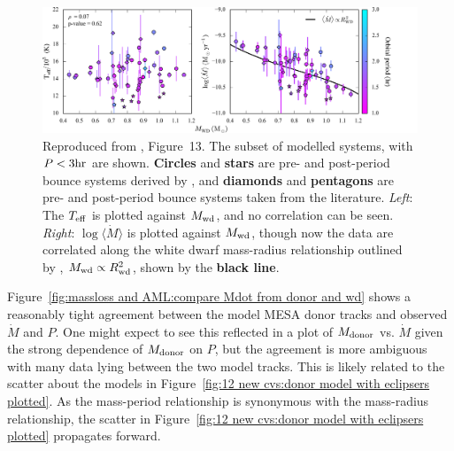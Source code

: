\begin{figure}
    \centering
    \includegraphics[width=\textwidth]{figures/modelling/pala_2022_fig13.png}
    \caption{Reproduced from \citet{Pala2021}, Figure~13. The subset of modelled systems, with $P < 3{\rm hr}$ are shown. {\bf Circles} and {\bf stars} are pre- and post-period bounce systems derived by \citet{Pala2021}, and {\bf diamonds} and {\bf pentagons} are pre- and post-period bounce systems taken from the literature. {\it Left}: The $T_{\rm eff}$ is plotted against $M_{\rm wd}$, and no correlation can be seen. {\it Right}: $\log \langle \dot M \rangle$ is plotted against $M_{\rm wd}$, though now the data are correlated along the white dwarf mass-radius relationship outlined by \citet{Pala2021}, $M_{\rm wd} \propto R_{\rm wd}^{2}$, shown by the {\bf black line}.}
    \label{fig:modelling:pala2022 fig13}
\end{figure}

Figure~\ref{fig:massloss and AML:compare Mdot from donor and wd} shows a reasonably tight agreement between the model MESA donor tracks and observed $\dot M$ and $P$.
One might expect to see this reflected in a plot of $M_{\rm donor}$ vs. $\dot M$ given the strong dependence of $M_{\rm donor}$ on $P$, but the agreement is more ambiguous with many data lying between the two model tracks.
This is likely related to the scatter about the models in Figure~\ref{fig:12 new cvs:donor model with eclipsers plotted}. As the mass-period relationship is synonymous with the mass-radius relationship, the scatter in Figure~\ref{fig:12 new cvs:donor model with eclipsers plotted} propagates forward.

